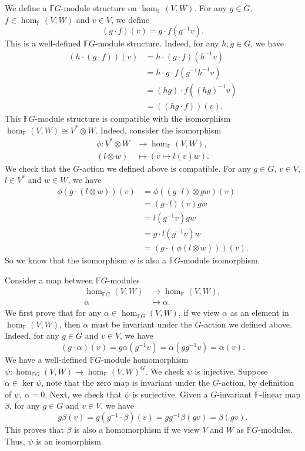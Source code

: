 \documentclass[a4paper, 12pt]{article}
\begin{document}
\begin{solution}
We define a \(\mathbb{F}G\)-module structure on \(\hom_\mathbb{F}(V,W)\). For any \(g\in G\), \(f\in \hom_\mathbb{F}(V,W)\) and \(v\in V\), we define 
\[(g\cdot f)(v)=g\cdot f(g^{-1}v).\]
This is a well-defined \(\mathbb{F}G\)-module structure. Indeed, for any \(h,g\in G\), we have 
\begin{align*}
	(h\cdot (g\cdot f))(v)&=h\cdot (g\cdot f)(h^{-1}v)\\ 
	                      &=h\cdot g\cdot f(g^{-1}h^{-1}v)\\ 
						  &=(hg)\cdot f((hg)^{-1}v)\\ 
						  &=((hg\cdot f))(v).
\end{align*}
This \(\mathbb{F}G\)-module structure is compatible with the isomorphism \(\hom_\mathbb{F}(V,W)\cong V^*\otimes W\). Indeed, consider the isomorphism 
\begin{align*}
	\phi:V^*\otimes W&\rightarrow \hom_\mathbb{F}(V,W),\\ 
	  (l\otimes w)&\mapsto (v\mapsto l(v)w).
\end{align*}
We check that the \(G\)-action we defined above is compatible. For any \(g\in G\), \(v\in V\), \(l\in V^*\) and \(w\in W\), we have 
\begin{align*}
	\phi(g\cdot (l\otimes w))(v)&=\phi((g\cdot l)\otimes gw)(v)\\ 
	                            &=(g\cdot l)(v)gw\\ 
								&=l(g^{-1}v)gw\\ 
								&=g\cdot l(g^{-1}v)w\\ 
								&=(g\cdot (\phi(l\otimes w)))(v).
\end{align*}
So we know that the isomorphism \(\phi\) is also a \(\mathbb{F}G\)-module isomorphism. 

Consider a map between \(\mathbb{F}G\)-modules 
\begin{align*}
	\hom_{\mathbb{F}G}(V,W)&\rightarrow \hom_\mathbb{F}(V,W),\\ 
	\alpha&\mapsto \alpha.
\end{align*}
We first prove that for any \(\alpha\in \hom_{\mathbb{F}G}(V,W)\), if we view \(\alpha\) as an element in \(\hom_\mathbb{F}(V,W)\), then \(\alpha\) must be invariant under the \(G\)-action we defined above. Indeed, for 
any \(g\in G\) and \(v\in V\), we have 
\[(g\cdot \alpha)(v)=g\alpha(g^{-1}v)=\alpha(gg^{-1}v)=\alpha(v).\]
We have a well-defined \(\mathbb{F}G\)-module homomorphism \(\psi:\hom_{\mathbb{F}G}(V,W)\rightarrow \hom_\mathbb{F}(V,W)^G\). We check \(\psi\) is injective. Suppose 
\(\alpha\in \ker \psi\), note that the zero map is invariant under the \(G\)-action, by definition of \(\psi\), \(\alpha=0\). Next, we check that \(\psi\) is surjective. Given a \(G\)-invariant \(\mathbb{F}\)-linear map \(\beta\), for any \(g\in G\) and \(v\in V\), we have 
\[g\beta(v)=g(g^{-1}\cdot \beta)(v)=gg^{-1}\beta(gv)=\beta(gv).\]
This proves that \(\beta\) is also a homomorphism if we view \(V\) and \(W\) as \(\mathbb{F}G\)-modules. Thus, \(\psi\) is an isomorphism. 
\end{solution}
\end{document}
